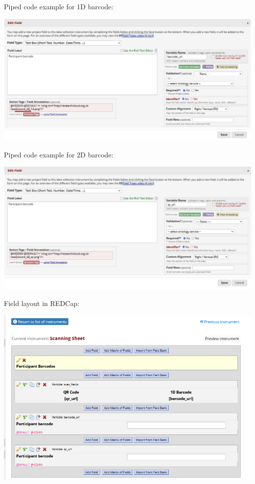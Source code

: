 \documentclass[
]{book}
\begin{document}
Piped code example for 1D barcode:

\includegraphics[width=14.88in]{img/1d_barcode}

Piped code example for 2D barcode:

\includegraphics[width=14.85in]{img/qr_code}

Field layout in REDCap:

\includegraphics[width=10.71in]{img/redcap_layout}
\end{document}
